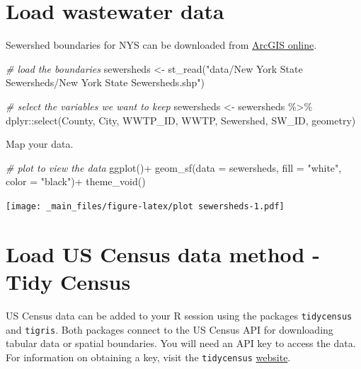 \documentclass[
]{book}
\newenvironment{Shaded}{\begin{snugshade}}{\end{snugshade}}
\newcommand{\AttributeTok}[1]{\textcolor[rgb]{0.77,0.63,0.00}{#1}}
\newcommand{\CommentTok}[1]{\textcolor[rgb]{0.56,0.35,0.01}{\textit{#1}}}
\newcommand{\FunctionTok}[1]{\textcolor[rgb]{0.00,0.00,0.00}{#1}}
\newcommand{\NormalTok}[1]{#1}
\newcommand{\OtherTok}[1]{\textcolor[rgb]{0.56,0.35,0.01}{#1}}
\newcommand{\SpecialCharTok}[1]{\textcolor[rgb]{0.00,0.00,0.00}{#1}}
\newcommand{\StringTok}[1]{\textcolor[rgb]{0.31,0.60,0.02}{#1}}
\begin{document}
\hypertarget{load-wastewater-data}{%
\section{Load wastewater data}\label{load-wastewater-data}}

Sewershed boundaries for NYS can be downloaded from \href{https://www.arcgis.com/home/item.html?id=e795007660ae4a1fae5f86b40d065b3a}{ArcGIS online}.

\begin{Shaded}
\begin{Highlighting}[]
\CommentTok{\# load the boundaries}
\NormalTok{sewersheds }\OtherTok{\textless{}{-}} \FunctionTok{st\_read}\NormalTok{(}\StringTok{"data/New York State Sewersheds/New York State Sewersheds.shp"}\NormalTok{)}

\CommentTok{\# select the variables we want to keep}
\NormalTok{sewersheds }\OtherTok{\textless{}{-}}\NormalTok{ sewersheds }\SpecialCharTok{\%\textgreater{}\%}
\NormalTok{  dplyr}\SpecialCharTok{::}\FunctionTok{select}\NormalTok{(County, City, WWTP\_ID, WWTP, Sewershed, SW\_ID, geometry)}
\end{Highlighting}
\end{Shaded}

Map your data.

\begin{Shaded}
\begin{Highlighting}[]
\CommentTok{\# plot to view the data}
\FunctionTok{ggplot}\NormalTok{()}\SpecialCharTok{+}
  \FunctionTok{geom\_sf}\NormalTok{(}\AttributeTok{data =}\NormalTok{ sewersheds, }\AttributeTok{fill =} \StringTok{"white"}\NormalTok{, }\AttributeTok{color =} \StringTok{"black"}\NormalTok{)}\SpecialCharTok{+}
  \FunctionTok{theme\_void}\NormalTok{()}
\end{Highlighting}
\end{Shaded}

\texttt{[image: \_main\_files/figure-latex/plot sewersheds-1.pdf]}

\hypertarget{load-us-census-data-method---tidy-census}{%
\section{Load US Census data method - Tidy Census}\label{load-us-census-data-method---tidy-census}}

US Census data can be added to your R session using the packages \texttt{tidycensus} and \texttt{tigris}. Both packages connect to the US Census API for downloading tabular data or spatial boundaries. You will need an API key to access the data. For information on obtaining a key, visit the \texttt{tidycensus} \href{https://walker-data.com/tidycensus/reference/census_api_key.html}{website}.
\end{document}
